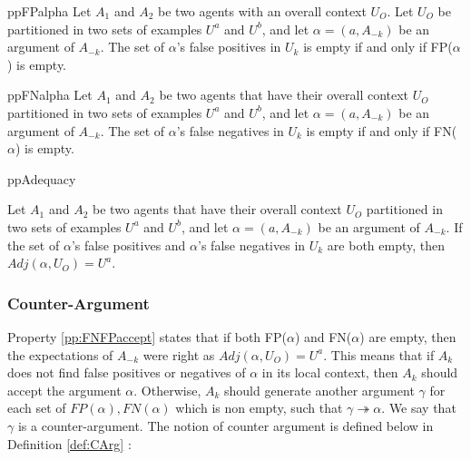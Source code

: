 \begin{restatable}{pp}{FPalpha}
\label{pp:FPalpha}
Let $A_{1}$ and $A_{2}$ be two agents with an overall context $U_{O}$. Let $U_{O}$ be partitioned in two sets of examples $U^{a}$ and $U^{b}$, and let $\alpha = (a,A_{-k})$ be an argument of $A_{-k}$. The set of $\alpha$'s false positives in $U_{k}$ is empty if and only if FP($\alpha$) is empty.

\end{restatable}

\begin{restatable}{pp}{FNalpha}
\label{pp:FNalpha}
Let $A_{1}$ and $A_{2}$ be two agents that have their overall context $U_{O}$ partitioned in two sets of examples $U^{a}$ and $U^{b}$, and let $\alpha = (a,A_{-k})$ be an argument of $A_{-k}$. The set of $\alpha$'s false negatives in $U_{k}$ is empty if and only if FN($\alpha$) is empty.

\end{restatable}

\begin{restatable}{pp}{Adequacy}
\label{pp:FNFPaccept}

Let $A_{1}$ and $A_{2}$ be two agents that have their overall context $U_{O}$ partitioned in two sets of examples $U^{a}$ and $U^{b}$, and let $\alpha = (a,A_{-k})$ be an argument of $A_{-k}$. If the set of $\alpha$'s false positives and $\alpha$'s false negatives in $U_{k}$ are both empty, then $Adj(\alpha,U_{O}) = U^{a}$.

\end{restatable}

\subsubsection{Counter-Argument}

Property \ref{pp:FNFPaccept} states that if both FP($\alpha$) and FN($\alpha$) are empty, then the expectations of $A_{-k}$ were right as $Adj(\alpha,U_{O}) = U^{a}$. This means that if $A_{k}$ does not find false positives or negatives of $\alpha$ in its local context, then $A_{k}$ should accept the argument $\alpha$.
Otherwise, $A_{k}$ should generate another argument $\gamma$ for each set of $FP(\alpha), FN(\alpha)$ which is non empty, such that $\gamma \twoheadrightarrow \alpha$. We say that $\gamma$ is a counter-argument. The notion of counter argument is defined below in Definition \ref{def:CArg} :

